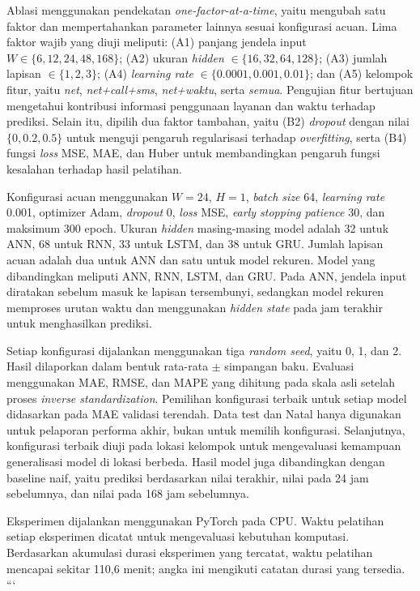 \documentclass[conference,a4paper]{IEEEtran}
\begin{document}
Ablasi menggunakan pendekatan \textit{one-factor-at-a-time}, yaitu mengubah satu faktor dan mempertahankan parameter lainnya sesuai konfigurasi acuan. Lima faktor wajib yang diuji meliputi: (A1) panjang jendela input $W \in \{6,12,24,48,168\}$; (A2) ukuran \textit{hidden} $\in \{16,32,64,128\}$; (A3) jumlah lapisan $\in \{1,2,3\}$; (A4) \textit{learning rate} $\in \{0.0001,0.001,0.01\}$; dan (A5) kelompok fitur, yaitu \textit{net}, \textit{net+call+sms}, \textit{net+waktu}, serta \textit{semua}. Pengujian fitur bertujuan mengetahui kontribusi informasi penggunaan layanan dan waktu terhadap prediksi. Selain itu, dipilih dua faktor tambahan, yaitu (B2) \textit{dropout} dengan nilai $\{0,0.2,0.5\}$ untuk menguji pengaruh regularisasi terhadap \textit{overfitting}, serta (B4) fungsi \textit{loss} MSE, MAE, dan Huber untuk membandingkan pengaruh fungsi kesalahan terhadap hasil pelatihan.

Konfigurasi acuan menggunakan $W=24$, $H=1$, \textit{batch size} 64, \textit{learning rate} 0.001, optimizer Adam, \textit{dropout} 0, \textit{loss} MSE, \textit{early stopping patience} 30, dan maksimum 300 epoch. Ukuran \textit{hidden} masing-masing model adalah 32 untuk ANN, 68 untuk RNN, 33 untuk LSTM, dan 38 untuk GRU. Jumlah lapisan acuan adalah dua untuk ANN dan satu untuk model rekuren. Model yang dibandingkan meliputi ANN, RNN, LSTM, dan GRU. Pada ANN, jendela input diratakan sebelum masuk ke lapisan tersembunyi, sedangkan model rekuren memproses urutan waktu dan menggunakan \textit{hidden state} pada jam terakhir untuk menghasilkan prediksi.

Setiap konfigurasi dijalankan menggunakan tiga \textit{random seed}, yaitu 0, 1, dan 2. Hasil dilaporkan dalam bentuk rata-rata $\pm$ simpangan baku. Evaluasi menggunakan MAE, RMSE, dan MAPE yang dihitung pada skala asli setelah proses \textit{inverse standardization}. Pemilihan konfigurasi terbaik untuk setiap model didasarkan pada MAE validasi terendah. Data test dan Natal hanya digunakan untuk pelaporan performa akhir, bukan untuk memilih konfigurasi. Selanjutnya, konfigurasi terbaik diuji pada lokasi kelompok untuk mengevaluasi kemampuan generalisasi model di lokasi berbeda. Hasil model juga dibandingkan dengan baseline naif, yaitu prediksi berdasarkan nilai terakhir, nilai pada 24 jam sebelumnya, dan nilai pada 168 jam sebelumnya.

Eksperimen dijalankan menggunakan PyTorch pada CPU. Waktu pelatihan setiap eksperimen dicatat untuk mengevaluasi kebutuhan komputasi. Berdasarkan akumulasi durasi eksperimen yang tercatat, waktu pelatihan mencapai sekitar 110,6 menit; angka ini mengikuti catatan durasi yang tersedia.
```
\end{document}
